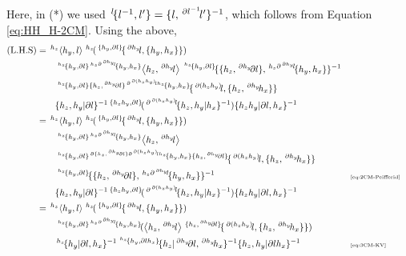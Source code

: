\documentclass[11pt, reqno]{amsart} %
\newcommand{\act}[1]{\,\sp{#1}\!}
\theoremstyle{definition}
\theoremstyle{remark}
\numberwithin{equation}{section}
\begin{document}
Here, in (*) we used $\act{l}\{l^{-1},l'\} = \{l,\act{\partial l^{-1}}l'\}^{-1}$, which follows from Equation \eqref{eq:HH_H-2CM}. Using the above,
\begin{align*}
  (\text{L.H.S}) &= 
  \act{h_z}\left<h_y,l\right>\act{h_z}(\act{\{h_y,\partial l\}}\{\act{\partial h_y}l,\{h_y,h_x\}\}) \\
  &\qquad  \act{\act{h_z}\{h_y,\partial l\}\act{h_z\partial \act{\partial h_y}l}\{h_y,h_x\}}\left<h_z,\act{\partial h_y}l\right>
  \act{\act{h_z}\{h_y,\partial l\}}\{\{h_z,\act{\partial h_y}\partial l\},\act{h_z\partial \act{\partial h_y}l}\{h_y,h_x\}\}^{-1} \\
  &\qquad 
  \act{\act{h_z}\{h_y,\partial l\}\{h_z,\act{\partial h_y}\partial l\}\act{\partial \act{\partial (h_zh_y)}lh_z}\{h_y,h_x\}}\{\act{\partial (h_zh_y)}l,\{h_z,\act{\partial h_y}h_x\}\} \\
  &\qquad 
  \{h_z,h_y|\partial l\}^{-1}
  \act{\{h_zh_y,\partial l\}}(\act{\partial\act{\partial (h_zh_y)}l}\{h_z,h_y|h_x\}^{-1})
  \{h_zh_y|\partial l,h_x\}^{-1} \\
  &= \act{h_z}\left<h_y,l\right>\act{h_z}(\act{\{h_y,\partial l\}}\{\act{\partial h_y}l,\{h_y,h_x\}\}) \\
  &\qquad  \act{\act{h_z}\{h_y,\partial l\}\act{h_z\partial \act{\partial h_y}l}\{h_y,h_x\}}\left<h_z,\act{\partial h_y}l\right> \\
  &\qquad 
  \act{\act{h_z}\{h_y,\partial l\}\act{\partial \{h_z,\act{\partial h_y}\partial l\}\partial \act{\partial (h_zh_y)}lh_z}\{h_y,h_x\}\{h_z,\act{\partial h_y}\partial l\}}\{\act{\partial (h_zh_y)}l,\{h_z,\act{\partial h_y}h_x\}\} \\
  &\qquad \act{\act{h_z}\{h_y,\partial l\}}\{\{h_z,\act{\partial h_y}\partial l\},\act{h_z\partial \act{\partial h_y}l}\{h_y,h_x\}\}^{-1} & &\text{\tiny \eqref{eq:2CM-Peifferid}} \\
  &\qquad 
  \{h_z,h_y|\partial l\}^{-1}
  \act{\{h_zh_y,\partial l\}}(\act{\partial\act{\partial (h_zh_y)}l}\{h_z,h_y|h_x\}^{-1})
  \{h_zh_y|\partial l,h_x\}^{-1} \\
  &= \act{h_z}\left<h_y,l\right>\act{h_z}(\act{\{h_y,\partial l\}}\{\act{\partial h_y}l,\{h_y,h_x\}\}) \\
  &\qquad  \act{\act{h_z}\{h_y,\partial l\}\act{h_z\partial \act{\partial h_y}l}\{h_y,h_x\}}(\left<h_z,\act{\partial h_y}l\right>\act{\{h_z,\act{\partial h_y}\partial l\}}\{\act{\partial (h_zh_y)}l,\{h_z,\act{\partial h_y}h_x\}\}) \\
  &\qquad 
  \act{h_z}\{h_y|\partial l,h_x\}^{-1}\act{\act{h_z}\{h_y,\partial lh_x\}}\{h_z|\act{\partial h_y}\partial l,\act{\partial h_y}h_x\}^{-1}\{h_z,h_y|\partial lh_x\}^{-1} & &\text{\tiny \eqref{eq:3CM-KV}} \\

\end{align*}
\end{document}
